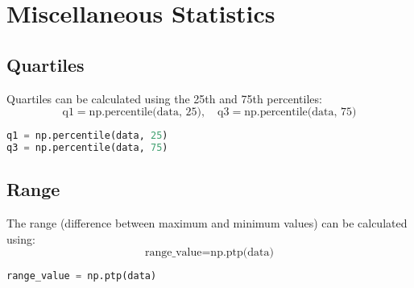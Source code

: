 \documentclass[a4paper, 12pt]{article}
\begin{document}
\section{Miscellaneous Statistics}

\subsection{ Quartiles}
Quartiles can be calculated using the 25th and 75th percentiles:
\[
\text{q1} = \text{np.percentile(data, 25)}, \quad \text{q3} = \text{np.percentile(data, 75)}
\]
\begin{lstlisting}[language=Python]
q1 = np.percentile(data, 25)
q3 = np.percentile(data, 75)
\end{lstlisting}

\subsection{Range}
The range (difference between maximum and minimum values) can be calculated using:
\[
\text{range\_value} = \text{np.ptp(data)}
\]
\begin{lstlisting}[language=Python]
range_value = np.ptp(data)
\end{lstlisting}
\end{document}

